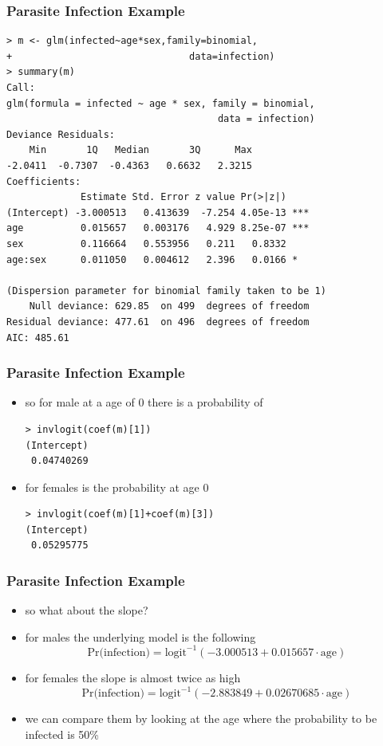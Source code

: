 \begin{frame}[fragile]\frametitle{Parasite Infection Example}\footnotesize
\begin{verbatim}
> m <- glm(infected~age*sex,family=binomial,
+                               data=infection)
> summary(m)
Call:
glm(formula = infected ~ age * sex, family = binomial, 
                                     data = infection)
Deviance Residuals: 
    Min       1Q   Median       3Q      Max  
-2.0411  -0.7307  -0.4363   0.6632   2.3215  
Coefficients:
             Estimate Std. Error z value Pr(>|z|)    
(Intercept) -3.000513   0.413639  -7.254 4.05e-13 ***
age          0.015657   0.003176   4.929 8.25e-07 ***
sex          0.116664   0.553956   0.211   0.8332    
age:sex      0.011050   0.004612   2.396   0.0166 *  

(Dispersion parameter for binomial family taken to be 1)
    Null deviance: 629.85  on 499  degrees of freedom
Residual deviance: 477.61  on 496  degrees of freedom
AIC: 485.61
\end{verbatim}
\end{frame}

\begin{frame}[fragile]\frametitle{Parasite Infection Example}
\begin{itemize}
\item so for male at a age of 0 there is a probability of
\begin{verbatim}
> invlogit(coef(m)[1])
(Intercept) 
 0.04740269 
\end{verbatim}
\item for females is the probability at age 0 
\begin{verbatim}
> invlogit(coef(m)[1]+coef(m)[3])
(Intercept) 
 0.05295775 
\end{verbatim}
\end{itemize}
\end{frame}


\begin{frame}[fragile]\frametitle{Parasite Infection Example}
\begin{itemize}
\item so what about the slope?
\item for males the underlying model is the following
$$\mbox{Pr(infection)}=\mbox{logit}^{-1}(-3.000513 + 0.015657 \cdot \mbox{age}) $$
\item for females the slope is almost twice as high
$$\mbox{Pr(infection)}=\mbox{logit}^{-1}(-2.883849 + 0.02670685  \cdot \mbox{age}) $$
\item we can compare them by looking at the age where the probability to be infected is 50\%
\end{itemize}
\end{frame}

